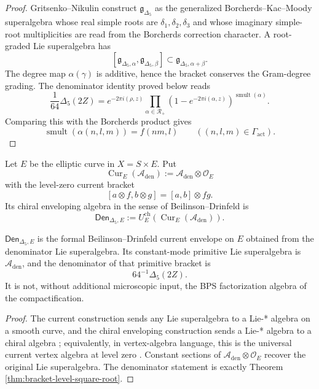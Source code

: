 \documentclass[11pt]{memoir}
\newcommand{\smult}{\operatorname{smult}}
\newcommand{\autcor}{\mathfrak{g}_{\Delta_5}}
\begin{document}
\begin{proof}
Gritsenko--Nikulin construct $\autcor$ as the generalized
Borcherds--Kac--Moody superalgebra whose real simple roots are
$\delta_1,\delta_2,\delta_3$ and whose imaginary simple-root
multiplicities are read from the Borcherds correction character.  A
root-graded Lie superalgebra has
$$
[\mathfrak g_{\Delta_5,\alpha},\mathfrak g_{\Delta_5,\beta}]
\subset\mathfrak g_{\Delta_5,\alpha+\beta}.
$$
The degree map $\alpha(\gamma)$ is additive, hence the bracket conserves
the Gram-degree grading.  The denominator identity proved below reads
$$
\frac1{64}\Delta_5(2Z)
=e^{-2\pi i(\rho,z)}
\prod_{\alpha\in\mathcal R_+}
(1-e^{-2\pi i(\alpha,z)})^{\smult(\alpha)}.
$$
Comparing this with the Borcherds product gives
$$
\smult(\alpha(n,l,m))=f(nm,l)
\qquad((n,l,m)\in\Gamma_{\mathrm{act}}).
$$
\end{proof}

\begin{definition}
Let $E$ be the elliptic curve in $X=S\times E$.  Put
$$
\operatorname{Cur}_E(\mathcal A_{\mathrm{den}})
:=\mathcal A_{\mathrm{den}}\otimes\mathcal O_E
$$
with the level-zero current bracket
$$
[a\otimes f,b\otimes g]=[a,b]\otimes fg.
$$
Its chiral enveloping algebra in the sense of Beilinson--Drinfeld
\cite{BD} is
$$
\mathsf{Den}_{\Delta_5,E}
:=U_E^{\mathrm{ch}}\!
\left(\operatorname{Cur}_E(\mathcal A_{\mathrm{den}})\right).
$$
\end{definition}

\begin{theorem}
\label{thm:factorization-square-root}
\(\mathsf{Den}_{\Delta_5,E}\) is the formal Beilinson--Drinfeld current
envelope on \(E\) obtained from the denominator Lie superalgebra.  Its
constant-mode primitive Lie superalgebra is
\(\mathcal A_{\mathrm{den}}\), and the denominator of that primitive
bracket is
$$
64^{-1}\Delta_5(2Z).
$$
It is not, without additional microscopic input, the BPS factorization
algebra of the compactification.
\end{theorem}

\begin{proof}
The current construction sends any Lie superalgebra to a Lie-* algebra
on a smooth curve, and the chiral enveloping construction sends a Lie-*
algebra to a chiral algebra \cite{BD}; equivalently, in vertex-algebra
language, this is the universal current vertex algebra at level zero
\cite{KACVA}.  Constant sections of
$\mathcal A_{\mathrm{den}}\otimes\mathcal O_E$ recover the original Lie
superalgebra.  The denominator statement is exactly
Theorem \ref{thm:bracket-level-square-root}.
\end{proof}
\end{document}
